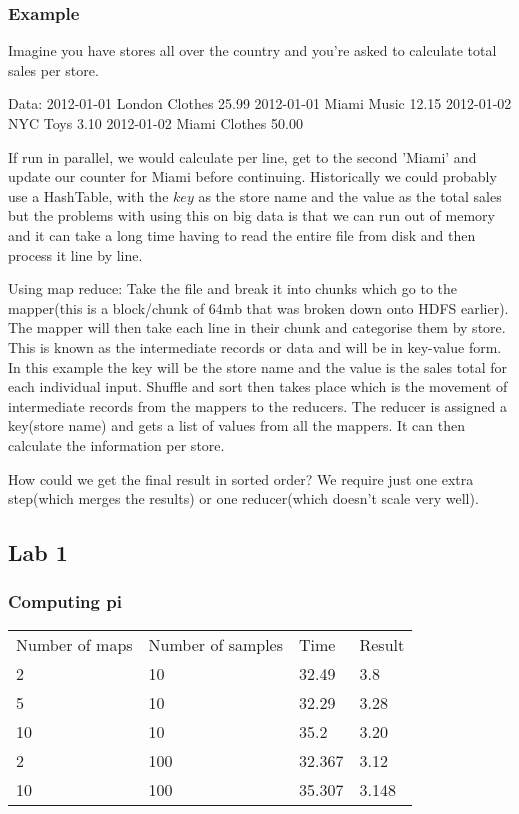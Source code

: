 \documentclass[11pt]{article}
\begin{document}
\subsubsection{Example}
Imagine you have stores all over the country and you're asked to calculate total sales per store.

Data:
2012-01-01 London Clothes 25.99
2012-01-01 Miami Music 12.15
2012-01-02 NYC Toys 3.10
2012-01-02 Miami Clothes 50.00

If run in parallel, we would calculate per line, get to the second 'Miami' and update our counter for Miami before continuing. Historically we could probably use a HashTable, with the $key$ as the store name and the value as the total sales but the problems with using this on big data is that we can run out of memory and it can take a long time having to read the entire file from disk and then process it line by line.

Using map reduce:
Take the file and break it into chunks which go to the mapper(this is a block/chunk of 64mb that was broken down onto HDFS earlier).
The mapper will then take each line in their chunk and categorise them by store. This is known as the intermediate records or data and will be in key-value form. In this example the key will be the store name and the value is the sales total for each individual input.
Shuffle and sort then takes place which is the movement of intermediate records from the mappers to the reducers.
The reducer is assigned a key(store name) and gets a list of values from all the mappers. It can then calculate the information per store.

How could we get the final result in sorted order? We require just one extra step(which merges the results) or one reducer(which doesn't scale very well).


\subsection{Lab 1}

\subsubsection*{Computing pi}
\begin{tabular}{l | l | l | l}
Number of maps & Number of samples & Time & Result \\
2 & 10 & 32.49 & 3.8 \\
5 & 10 & 32.29 & 3.28 \\
10 & 10 & 35.2 & 3.20 \\
2 & 100 & 32.367 & 3.12 \\
10 & 100 & 35.307 & 3.148
\end{tabular}
\end{document}
